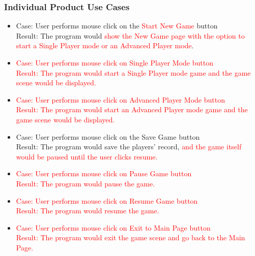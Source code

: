 \documentclass[12pt,letterpaper]{article}
\begin{document}
\subsubsection{Individual Product Use Cases}
\begin{itemize}

	\item Case: User performs mouse click on the \textcolor{red}{Start New Game} button\\
	Result: The program would \textcolor{red}{show the New Game page with the option to start a Single Player mode or an Advanced Player mode}.\\

	\item \textcolor{red}{Case: User performs mouse click on Single Player Mode button}\\
	\textcolor{red}{Result: The program would start a Single Player mode game and the game scene would be displayed.}\\

	\item \textcolor{red}{Case: User performs mouse click on Advanced Player Mode button}\\
	\textcolor{red}{Result: The program would start an Advanced Player mode game and the game scene would be displayed.}\\
	
	\item Case: User performs mouse click on the Save Game button\\
	Result:  The program would save the players’ record, \textcolor{red}{and the game itself would be paused until the user clicks resume.} \\
	
	\item \textcolor{red}{Case: User performs mouse click on Pause Game button}\\
	\textcolor{red}{Result: The program would pause the game.}\\

	\item \textcolor{red}{Case: User performs mouse click on Resume Game button}\\
	\textcolor{red}{Result: The program would resume the game.}\\

	\item \textcolor{red}{Case: User performs mouse click on Exit to Main Page button}\\
	\textcolor{red}{Result: The program would exit the game scene and go back to the Main Page.}\\


\end{itemize}
\end{document}
